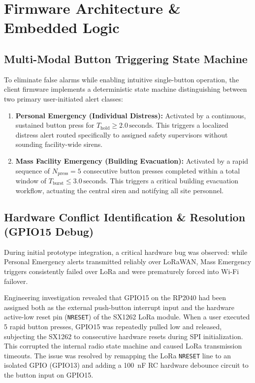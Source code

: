 \section{Firmware Architecture \& Embedded Logic}

\subsection{Multi-Modal Button Triggering State Machine}
To eliminate false alarms while enabling intuitive single-button operation, the client firmware implements a deterministic state machine distinguishing between two primary user-initiated alert classes:
\begin{enumerate}
    \item \textbf{Personal Emergency (Individual Distress):} Activated by a continuous, sustained button press for $T_{\text{hold}} \ge 2.0\,\text{seconds}$. This triggers a localized distress alert routed specifically to assigned safety supervisors without sounding facility-wide sirens.
    \item \textbf{Mass Facility Emergency (Building Evacuation):} Activated by a rapid sequence of $N_{\text{press}} = 5$ consecutive button presses completed within a total window of $T_{\text{burst}} \le 3.0\,\text{seconds}$. This triggers a critical building evacuation workflow, actuating the central siren and notifying all site personnel.
\end{enumerate}

\subsection{Hardware Conflict Identification \& Resolution (GPIO15 Debug)}
During initial prototype integration, a critical hardware bug was observed: while Personal Emergency alerts transmitted reliably over LoRaWAN, Mass Emergency triggers consistently failed over LoRa and were prematurely forced into Wi-Fi failover. 

Engineering investigation revealed that GPIO15 on the RP2040 had been assigned both as the external push-button interrupt input and the hardware active-low reset pin (\texttt{NRESET}) of the SX1262 LoRa module. When a user executed 5 rapid button presses, GPIO15 was repeatedly pulled low and released, subjecting the SX1262 to consecutive hardware resets during SPI initialization. This corrupted the internal radio state machine and caused LoRa transmission timeouts. The issue was resolved by remapping the LoRa \texttt{NRESET} line to an isolated GPIO (GPIO13) and adding a 100~nF RC hardware debounce circuit to the button input on GPIO15.

